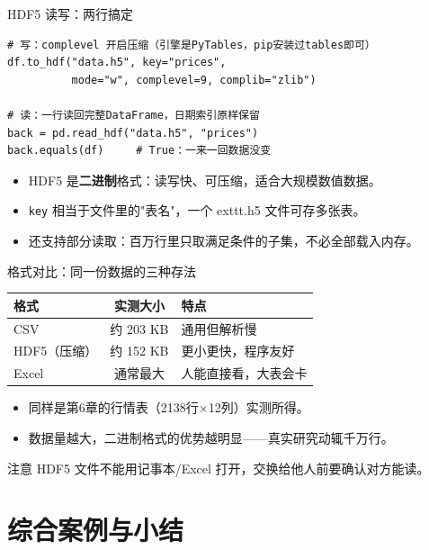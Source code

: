 \documentclass[9pt]{ctexbeamer}
\begin{document}
\begin{frame}[fragile]{HDF5 读写：两行搞定}
	\begin{lstlisting}
# 写：complevel 开启压缩（引擎是PyTables，pip安装过tables即可）
df.to_hdf("data.h5", key="prices",
          mode="w", complevel=9, complib="zlib")

# 读：一行读回完整DataFrame，日期索引原样保留
back = pd.read_hdf("data.h5", "prices")
back.equals(df)     # True：一来一回数据没变
\end{lstlisting}
	\begin{itemize}
		\item HDF5 是\textbf{二进制}格式：读写快、可压缩，适合大规模数值数据。
		\item \texttt{key} 相当于文件里的"表名"，一个 	exttt{.h5} 文件可存多张表。
		\item 还支持\alert{部分读取}：百万行里只取满足条件的子集，不必全部载入内存。
	\end{itemize}
\end{frame}

\begin{frame}{格式对比：同一份数据的三种存法}
	\begin{table}
		\centering
		\begin{tabular}{lcl}
			\toprule
			格式 & 实测大小 & 特点 \\
			\midrule
			CSV & 约 203 KB & 通用但解析慢 \\
			HDF5（压缩） & 约 152 KB & 更小更快，程序友好 \\
			Excel & 通常最大 & 人能直接看，大表会卡 \\
			\bottomrule
		\end{tabular}
	\end{table}
	\begin{itemize}
		\item 同样是第6章的行情表（2138行$\times$12列）实测所得。
		\item 数据量越大，二进制格式的优势越明显——真实研究动辄千万行。
	\end{itemize}
	\begin{alertblock}{注意}
		HDF5 文件不能用记事本/Excel 打开，交换给他人前要确认对方能读。
	\end{alertblock}
\end{frame}


\section{综合案例与小结}
\end{document}
